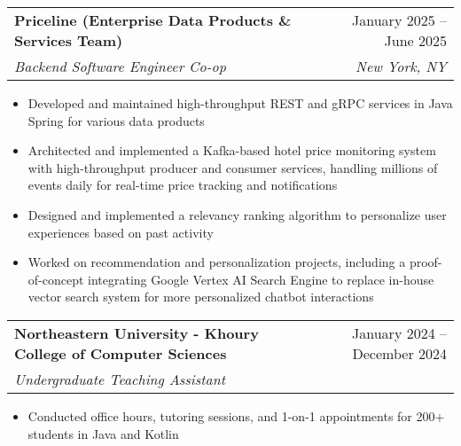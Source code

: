 \documentclass[letterpaper,11pt]{article}
\makeatletter
\newcommand{\resumeItem}[1]{
  \item\small{
    {#1 \vspace{-2pt}}
  }
}
\newcommand{\resumeSubheading}[4]{
  \vspace{-2pt}\item
    \begin{tabular*}{0.97\textwidth}[t]{l@{\extracolsep{\fill}}r}
      \textbf{#1} & #2 \\
      \textit{\small#3} & \textit{\small #4} \\
    \end{tabular*}\vspace{-7pt}
}
\newcommand{\resumeSubSubheading}[2]{
    \item
    \begin{tabular*}{0.97\textwidth}{l@{\extracolsep{\fill}}r}
      \textit{\small#1} & \textit{\small #2} \\
    \end{tabular*}\vspace{-7pt}
}
\newcommand{\resumeItemListStart}{\begin{itemize}}
\newcommand{\resumeItemListEnd}{\end{itemize}\vspace{-5pt}}
\makeatother
\begin{document}

  \resumeSubheading
  {Priceline (Enterprise Data Products \& Services Team)}{January 2025 -- June 2025}
  {Backend Software Engineer Co-op}{New York, NY}
  \resumeItemListStart
    \resumeItem{Developed and maintained high-throughput REST and gRPC services in Java Spring for various data products}%
    \resumeItem{Architected and implemented a Kafka-based hotel price monitoring system with high-throughput producer and consumer services, handling millions of events daily for real-time price tracking and notifications}
    \resumeItem{Designed and implemented a relevancy ranking algorithm to personalize user experiences based on past activity}
    \resumeItem{Worked on recommendation and personalization projects, including a proof-of-concept integrating Google Vertex AI Search Engine to replace in-house vector search system for more personalized chatbot interactions}
  \resumeItemListEnd

  \resumeSubheading
    {Northeastern University - Khoury College of Computer Sciences}{January 2024 -- December 2024}
    {Undergraduate Teaching Assistant}{}
    \resumeItemListStart
      \resumeItem{Conducted office hours, tutoring sessions, and 1-on-1 appointments for 200+ students in Java and Kotlin}
    \resumeItemListEnd
    
\end{document}
